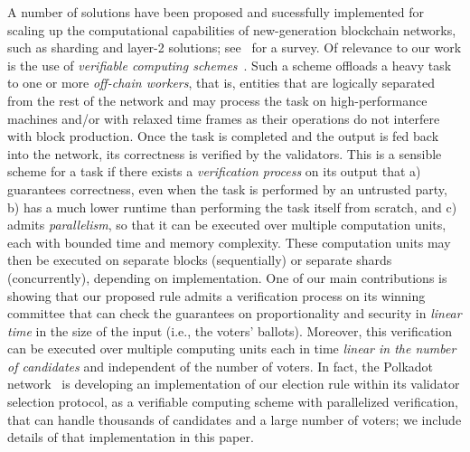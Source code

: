 A number of solutions have been proposed and sucessfully implemented for scaling up the computational capabilities of new-generation blockchain networks, such as sharding and layer-2 solutions; see~\cite{zhou2020solutions} for a survey. 
Of relevance to our work is the use of \emph{verifiable computing schemes}~\cite{gennaro2010non}. Such a scheme offloads a heavy task to one or more \emph{off-chain workers}, that is, entities that are logically separated from the rest of the network and may process the task on high-performance machines and/or with relaxed time frames as their operations do not interfere with block production. Once the task is completed and the output is fed back into the network, its correctness is verified by the validators. 
This is a sensible scheme for a task if there exists a \emph{verification process} on its output that a) guarantees correctness, even when the task is performed by an untrusted party, b) has a much lower runtime than performing the task itself from scratch, and c) admits \emph{parallelism}, so that it can be executed over multiple computation units, each with bounded time and memory complexity. 
These computation units may then be executed on separate blocks (sequentially) or separate shards (concurrently), depending on implementation.
One of our main contributions is showing that our proposed rule admits a verification process on its winning committee that can check the guarantees on proportionality and security in \emph{linear time} in the size of the input (i.e., the voters' ballots). Moreover, this verification can be executed over multiple computing units each in time \emph{linear in the number of candidates} and independent of the number of voters. 
In fact, the Polkadot network~\cite{burdges2020overview} is developing an implementation of our election rule within its validator selection protocol, as a verifiable computing scheme with parallelized verification, that can handle thousands of candidates and a large number of voters; we include details of that implementation in this paper. 

